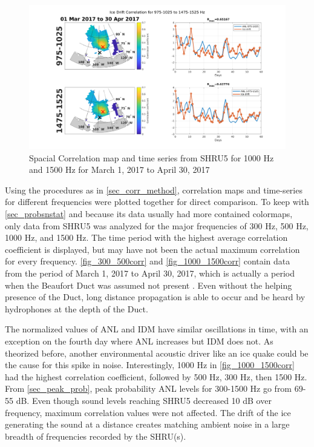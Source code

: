 \begin{figure}[p]
\centering
\includegraphics[scale=0.35]{Figures/1000_1500_spatial_corr_20170301-20170430.png}
\caption{Spacial Correlation map and time series from SHRU5 for 1000 Hz and 1500 Hz for March 1, 2017 to April 30, 2017}
\label{fig_1000_1500corr}
\end{figure}

Using the procedures as in \autoref{sec_corr_method}, correlation maps and time-series for different frequencies were plotted together for direct comparison. To keep with \autoref{sec_probsnstat} and because its data usually had more contained colormaps, only data from SHRU5 was analyzed for the major frequencies of 300 Hz, 500 Hz, 1000 Hz, and 1500 Hz. The time period with the highest average correlation coefficient is displayed, but may have not been the actual maximum correlation for every frequency. \autoref{fig_300_500corr} and \autoref{fig_1000_1500corr} contain data from the period of March 1, 2017 to April 30, 2017, which is actually a period when the Beaufort Duct was assumed not present \parencite{ballard2020yearlong}. Even without the helping presence of the Duct, long distance propagation is able to occur and be heard by hydrophones at the depth of the Duct. 

The normalized values of ANL and IDM have similar oscillations in time, with an exception on the fourth day where ANL increases but IDM does not. As theorized before, another environmental acoustic driver like an ice quake could be the cause for this spike in noise. Interestingly, 1000 Hz in \autoref{fig_1000_1500corr} had the highest correlation coefficient, followed by 500 Hz, 300 Hz, then 1500 Hz. From \autoref{sec_peak_prob}, peak probability ANL levels for 300-1500 Hz go from 69-55 dB. Even though sound levels reaching SHRU5 decreased 10 dB over frequency, maximum correlation values were not affected. The drift of the ice generating the sound at a distance creates matching ambient noise in a large breadth of frequencies recorded by the SHRU(s). 

